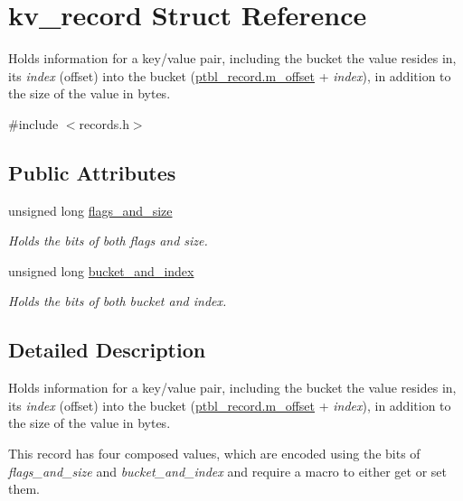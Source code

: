 \hypertarget{structkv__record}{}\section{kv\+\_\+record Struct Reference}
\label{structkv__record}


Holds information for a key/value pair, including the bucket the value resides in, it\textquotesingle{}s {\itshape index} (offset) into the bucket (\mbox{\hyperlink{structptbl__record_acec45fcdf4427d3a1b62c84973d5f484}{ptbl\+\_\+record.\+m\+\_\+offset}} + {\itshape index}), in addition to the size of the value in bytes.  




{\ttfamily \#include $<$records.\+h$>$}

\subsection*{Public Attributes}
\begin{DoxyCompactItemize}
\item 
unsigned long \mbox{\hyperlink{structkv__record_aeb53c0b3c86b47eaddb5ad8b83f6ed69}{flags\+\_\+and\+\_\+size}}
\begin{DoxyCompactList}\small\item\em Holds the bits of both {\itshape flags} and {\itshape size}. \end{DoxyCompactList}\item 
unsigned long \mbox{\hyperlink{structkv__record_aa6e3c994316398afea8be6a05094f5b0}{bucket\+\_\+and\+\_\+index}}
\begin{DoxyCompactList}\small\item\em Holds the bits of both {\itshape bucket} and {\itshape index}. \end{DoxyCompactList}\end{DoxyCompactItemize}


\subsection{Detailed Description}
Holds information for a key/value pair, including the bucket the value resides in, it\textquotesingle{}s {\itshape index} (offset) into the bucket (\mbox{\hyperlink{structptbl__record_acec45fcdf4427d3a1b62c84973d5f484}{ptbl\+\_\+record.\+m\+\_\+offset}} + {\itshape index}), in addition to the size of the value in bytes. 

This record has four composed values, which are encoded using the bits of {\itshape flags\+\_\+and\+\_\+size} and {\itshape bucket\+\_\+and\+\_\+index} and require a macro to either get or set them.

